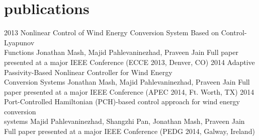 \section{publications}

\begin{entrylist}
\entry
{2013}
{Nonlinear Control of Wind Energy Conversion System Based on Control-Lyapunov \\Functions}
{{\headingfont Jonathan Mash}, Majid Pahlevaninezhad, Praveen Jain}
{Full paper presented at a major IEEE Conference (ECCE 2013, Denver, CO)}
\entry
{2014}
{Adaptive Passivity-Based Nonlinear Controller for Wind Energy \\Conversion Systems}
{{\headingfont Jonathan Mash}, Majid Pahlevaninezhad, Praveen Jain}
{Full paper presented at a major IEEE Conference (APEC 2014, Ft. Worth, TX)}
\entry
{2014}
{Port-Controlled Hamiltonian (PCH)-based control approach for wind energy conversion \\systems}
{Majid Pahlevaninezhad, Shangzhi Pan, {\headingfont Jonathan Mash}, Praveen Jain}
{Full paper presented at a major IEEE Conference (PEDG 2014, Galway, Ireland)}
\end{entrylist}